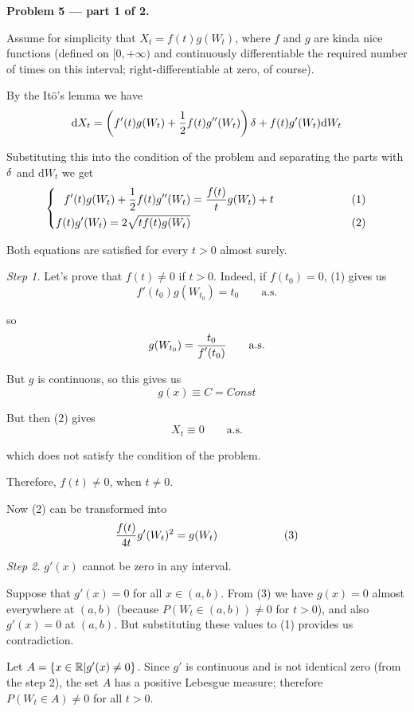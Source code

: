 \documentclass[pdftex,12pt,a4paper]{article}
\begin{document}
\textbf{Problem 5 --- part 1 of 2.}\par
Assume for simplicity that $X_{t} = f(t)g(W_{t})$, where $f$ and $g$ are kinda nice functions (defined on $[0, +\infty)$ and continuously differentiable the required number of times on this interval; right-differentiable at zero, of course).\par
By the It$\hat{\mbox{o}}$'s lemma we have
$$
\mathrm{d}X_{t} = \left(f'(t)g(W_{t}) + \frac{\displaystyle 1}{\displaystyle 2}f(t)g''(W_{t})\right)\delta + f(t)g'(W_{t})\mathrm{d}W_{t}
$$\par
Substituting this into the condition of the problem and separating the parts with $\delta$ and $\mathrm{d}W_{t}$ we get
$$
\left\{
\begin{aligned}
f'(t)g(W_{t})+\frac{\displaystyle 1}{\displaystyle 2}f(t)g''(W_{t})  &= \frac{\displaystyle f(t)}{\displaystyle t}g(W_{t}) + t\qquad\qquad\qquad &(1)\\
 f(t)g'(W_{t}) = 2\sqrt{tf(t)g(W_{t})} & \qquad\qquad\qquad &(2)
\end{aligned}
\right.
$$\par
Both equations are satisfied for every $t > 0$ almost surely.\[\]\par
\textit{Step 1.} Let's prove that $f(t) \neq 0$ if $t > 0$. Indeed, if $f(t_{0}) = 0$, (1) gives us 
$$
f'(t_{0}) g(W_{t_{0}}) = t_{0}\qquad \mbox{a.s.}
$$\par
so
$$
g(W_{t_{0}}) = \frac{\displaystyle t_{0}}{\displaystyle f'(t_{0})}\qquad \mbox{a.s.}
$$\par
But $g$ is continuous, so this gives us 
$$
g(x) \equiv C = Const
$$ \par
But then (2) gives
$$
X_{t} \equiv 0 \qquad \mbox{a.s.}
$$\par
which does not satisfy the condition of the problem.\par
Therefore, $f(t) \neq 0$, when $t \neq 0$.\[\]\par
Now (2) can be transformed into 
$$
\frac{\displaystyle f(t)}{\displaystyle 4t}g'(W_{t})^{2} = g(W_{t})\qquad\qquad\qquad (3)
$$\par
\textit{Step 2.} $g'(x)$ cannot be zero in any interval.\par
Suppose that $g'(x) = 0$ for all $x \in (a,b)$. From (3) we have $g(x) = 0$ almost everywhere at $(a,b)$ (because $P(W_{t} \in (a,b)) \neq 0$ for $t > 0$), and also $g'(x) = 0$ at $(a,b)$. But substituting these values to (1) provides us contradiction.\[\]\par
Let $A = \{x \in \mathbb R | g'(x) \neq 0\}$. Since $g'$ is continuous and is not identical zero (from the step 2), the set $A$ has a positive Lebesgue measure; therefore $P(W_{t} \in A) \neq 0$ for all $t > 0$.
\end{document}
